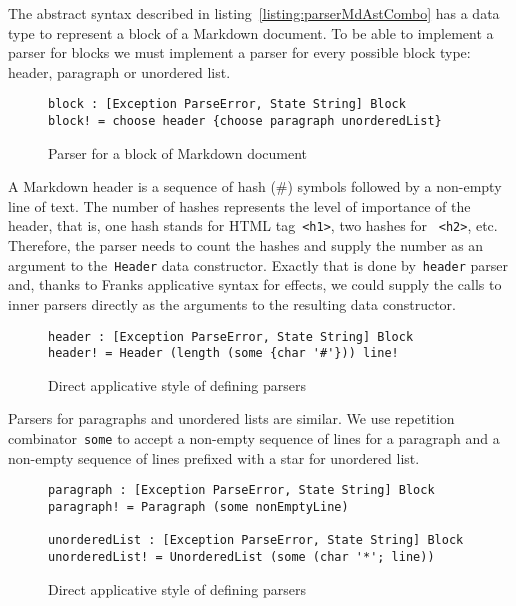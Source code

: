       The abstract syntax described in listing~\ref{listing:parserMdAstCombo}
      has a data type to represent a block of a Markdown document. To be able to
      implement a parser for blocks we must implement a parser for every possible
      block type: header, paragraph or unordered list.

      \begin{figure}[h]
      \begin{lstlisting}
block : [Exception ParseError, State String] Block
block! = choose header {choose paragraph unorderedList}
      \end{lstlisting}
      \caption{Parser for a block of Markdown document}
      \label{listing:parserExprAppCombo}
      \end{figure}

      A Markdown header is a sequence of hash (\#) symbols followed by a
      non-empty line of text. The number of hashes represents the level of
      importance of the header, that is, one hash stands for HTML
      tag~\texttt{<h1>}, two hashes for ~\texttt{<h2>}, etc. Therefore, the parser
      needs to count the hashes and supply the number as an argument to the~\texttt{Header}
      data constructor. Exactly that is done by~\texttt{header} parser and, thanks to Franks
      applicative syntax for effects, we could supply the calls to inner parsers directly
      as the arguments to the resulting data constructor.

      \begin{figure}[h]
      \begin{lstlisting}
header : [Exception ParseError, State String] Block
header! = Header (length (some {char '#'})) line!
      \end{lstlisting}
      \caption{Direct applicative style of defining parsers}
      \label{listing:parserExprAppCombo}
      \end{figure}

      Parsers for paragraphs and unordered lists are similar. We use repetition
      combinator~\texttt{some} to accept a non-empty sequence of lines for a paragraph and
      a non-empty sequence of lines prefixed with a star for unordered list.

      \begin{figure}[h]
      \begin{lstlisting}
paragraph : [Exception ParseError, State String] Block
paragraph! = Paragraph (some nonEmptyLine)

unorderedList : [Exception ParseError, State String] Block
unorderedList! = UnorderedList (some (char '*'; line))
      \end{lstlisting}
      \caption{Direct applicative style of defining parsers}
      \label{listing:parserExprAppCombo}
      \end{figure}

